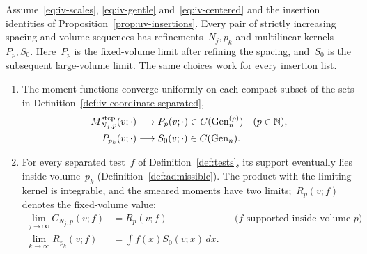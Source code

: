 \begin{proposition}\label{prop:iv-raw}
Assume~\eqref{eq:iv-scales}, \eqref{eq:iv-gentle} and~\eqref{eq:iv-centered} and the insertion identities of Proposition~\ref{prop:uv-insertions}.
Every pair of strictly increasing spacing and volume sequences has refinements~$N_j,p_k$ and multilinear kernels~$P_p,S_0$. Here~$P_p$ is the fixed-volume limit after refining the spacing, and~$S_0$ is the subsequent large-volume limit. The same choices work for every insertion list.
\begin{enumerate}[label=\textup{(\roman*)},ref=\theproposition(\roman*)]
\item\label{item:iv-raw-points} The moment functions converge uniformly on each compact subset of the sets in Definition~\ref{def:iv-coordinate-separated},
\begin{equation}\label{eq:iv-point-limits}
\begin{aligned}
 M^{\mathrm{step}}_{N_j,p}(v;\cdot)&\longrightarrow P_p(v;\cdot)\in C(\operatorname{Gen}^{(p)}_n)
 &&(p\in\mathbb N),\\
 P_{p_k}(v;\cdot)&\longrightarrow S_0(v;\cdot)\in C(\operatorname{Gen}_n).
\end{aligned}
\end{equation}
\item\label{item:iv-raw-smears} For every separated test~$f$ of Definition~\ref{def:tests}, its support eventually lies inside volume~$p_k$ (Definition~\ref{def:admissible}). The product with the limiting kernel is integrable, and the smeared moments have two limits;~$R_p(v;f)$ denotes the fixed-volume value:
\begin{equation}\label{eq:iv-auxiliary-limit}
\begin{aligned}
 \lim_{j\to\infty}C_{N_j,p}(v;f)&=R_p(v;f)
 &&\text{($f$ supported inside volume $p$)},\\
 \lim_{k\to\infty}R_{p_k}(v;f)&=\int f(x)S_0(v;x)\,dx.
\end{aligned}
\end{equation}
\end{enumerate}
\end{proposition}

